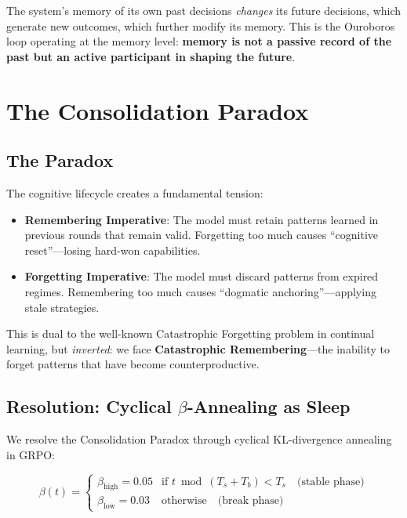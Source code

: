 \documentclass[11pt, a4paper]{article}
\begin{document}
The system's memory of its own past decisions \emph{changes} its future decisions, which generate new outcomes, which further modify its memory. This is the Ouroboros loop operating at the memory level: \textbf{memory is not a passive record of the past but an active participant in shaping the future}.


\section{The Consolidation Paradox}
\label{sec:consolidation}

\subsection{The Paradox}

The cognitive lifecycle creates a fundamental tension:

\begin{itemize}
  \item \textbf{Remembering Imperative}: The model must retain patterns learned in previous rounds that remain valid. Forgetting too much causes ``cognitive reset''---losing hard-won capabilities.
  \item \textbf{Forgetting Imperative}: The model must discard patterns from expired regimes. Remembering too much causes ``dogmatic anchoring''---applying stale strategies.
\end{itemize}

This is dual to the well-known Catastrophic Forgetting problem in continual learning, but \emph{inverted}: we face \textbf{Catastrophic Remembering}---the inability to forget patterns that have become counterproductive.

\subsection{Resolution: Cyclical $\beta$-Annealing as Sleep}

We resolve the Consolidation Paradox through cyclical KL-divergence annealing in GRPO:

\begin{equation}
  \beta(t) = \begin{cases}
    \beta_{\text{high}} = 0.05 & \text{if } t \bmod (T_s + T_b) < T_s \quad \text{(stable phase)} \\
    \beta_{\text{low}} = 0.03 & \text{otherwise} \quad \text{(break phase)}
  \end{cases}
\end{equation}
\end{document}
